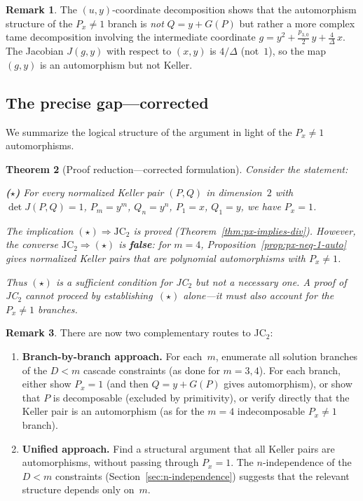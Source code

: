 \documentclass[12pt,a4paper]{article}
\newtheorem{theorem}{Theorem}[section]
\theoremstyle{definition}
\newtheorem{remark}[theorem]{Remark}
\begin{document}
\begin{remark}
The $(u,y)$-coordinate decomposition shows that the automorphism structure
of the $P_x \neq 1$ branch is \emph{not} $Q = y + G(P)$ but rather
a more complex tame decomposition involving the intermediate
coordinate $g = y^2 + \tfrac{p_{3,0}}{2}\,y + \tfrac{4}{\Delta}\,x$.
The Jacobian $J(g,y)$ with respect to $(x,y)$ is $4/\Delta$
(not~$1$), so the map $(g,y)$ is an automorphism but not Keller.
\end{remark}

\subsection{The precise gap---corrected}\label{sec:gap}

We summarize the logical structure of the argument in light of the
$P_x \neq 1$ automorphisms.

\begin{theorem}[Proof reduction---corrected formulation]\label{thm:precise-gap}
Consider the statement:

\medskip
\noindent\textbf{($\star$)} \emph{For every normalized Keller pair
$(P,Q)$ in dimension~$2$ with $\det J(P,Q) = 1$, $P_m = y^m$,
$Q_n = y^n$, $P_1 = x$, $Q_1 = y$, we have $P_x = 1$.}

\medskip
\noindent The implication $(\star) \Rightarrow \mathrm{JC}_2$ is proved
(Theorem~\textup{\ref{thm:px-implies-div}}).
However, the converse $\mathrm{JC}_2 \Rightarrow (\star)$ is
\textbf{false}: for $m = 4$, Proposition~\textup{\ref{prop:px-neq-1-auto}}
gives normalized Keller pairs that are polynomial automorphisms with
$P_x \neq 1$.

Thus $(\star)$ is a \emph{sufficient} condition for JC$_2$
but not a \emph{necessary} one. A proof of JC$_2$ cannot proceed
by establishing~$(\star)$ alone---it must also account for the
$P_x \neq 1$ branches.
\end{theorem}

\begin{remark}\label{rem:two-routes}
There are now two complementary routes to JC$_2$:
\begin{enumerate}
\item \textbf{Branch-by-branch approach.}
  For each~$m$, enumerate all solution branches of the $D < m$
  cascade constraints (as done for $m = 3, 4$). For each branch,
  either show $P_x = 1$ (and then $Q = y + G(P)$ gives automorphism),
  or show that $P$ is decomposable (excluded by primitivity),
  or verify directly that the Keller pair is an automorphism
  (as for the $m = 4$ indecomposable $P_x \neq 1$ branch).
\item \textbf{Unified approach.}
  Find a structural argument that all Keller pairs are automorphisms,
  without passing through $P_x = 1$.
  The $n$-independence of the $D < m$ constraints
  (Section~\ref{sec:n-independence}) suggests that the relevant
  structure depends only on~$m$.
\end{enumerate}
\end{remark}
\end{document}
